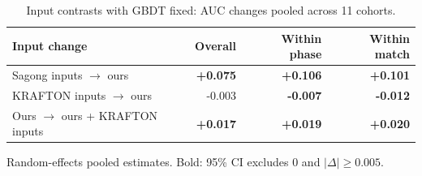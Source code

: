 \begin{table}[t]
\centering\footnotesize
\caption{Input contrasts with GBDT fixed: AUC changes pooled across 11 cohorts.}
\label{tab:inputs}
\setlength{\tabcolsep}{3pt}
\begin{tabular}{lrrr}
\toprule
Input change & Overall & Within phase & Within match \\
\midrule
Sagong inputs $\to$ ours & \textbf{+0.075} & \textbf{+0.106} & \textbf{+0.101} \\
KRAFTON inputs $\to$ ours & -0.003 & \textbf{-0.007} & \textbf{-0.012} \\
Ours $\to$ ours + KRAFTON inputs & \textbf{+0.017} & \textbf{+0.019} & \textbf{+0.020} \\
\bottomrule
\end{tabular}
\smallskip
\parbox{\columnwidth}{\scriptsize Random-effects pooled estimates. Bold: 95\% CI excludes 0 and $|\Delta|\geq0.005$.}
\end{table}
